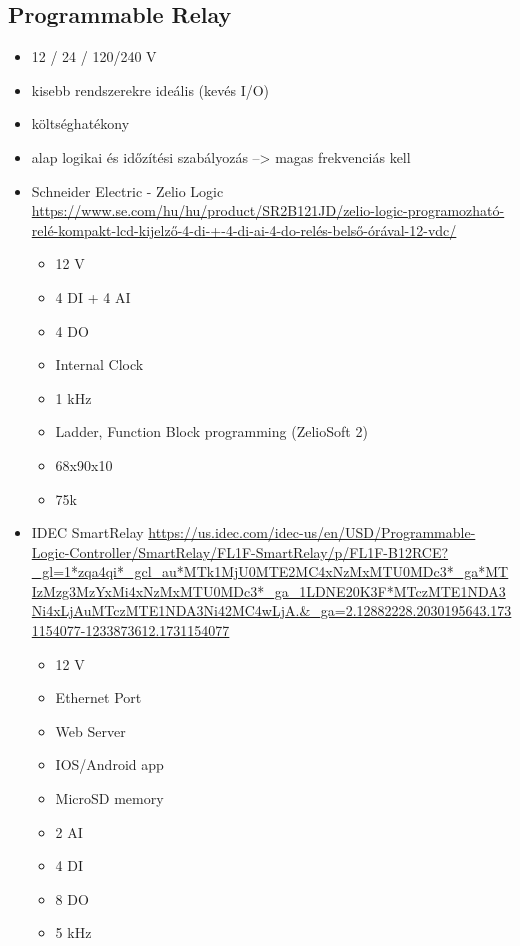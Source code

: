 \documentclass{article}
\begin{document}
	\subsection{Programmable Relay}
	
	\begin{itemize}
		\item 12 / 24 / 120/240 V 
		\item kisebb rendszerekre ideális (kevés I/O)
		\item költséghatékony
		\item alap logikai és időzítési szabályozás --> magas frekvenciás kell
	\end{itemize}
	
	
	\begin{itemize}
		\item Schneider Electric - Zelio Logic\\
			\url{https://www.se.com/hu/hu/product/SR2B121JD/zelio-logic-programozható-relé-kompakt-lcd-kijelző-4-di-+-4-di-ai-4-do-relés-belső-órával-12-vdc/}
			\begin{itemize}
				\item 12 V
				\item 4 DI + 4 AI
				\item 4 DO
				\item Internal Clock
				\item 1 kHz
				\item Ladder, Function Block programming (ZelioSoft 2)
				\item 68x90x10
				\item 75k
			\end{itemize}
		\item IDEC SmartRelay
			\url{https://us.idec.com/idec-us/en/USD/Programmable-Logic-Controller/SmartRelay/FL1F-SmartRelay/p/FL1F-B12RCE?_gl=1*zqa4qi*_gcl_au*MTk1MjU0MTE2MC4xNzMxMTU0MDc3*_ga*MTIzMzg3MzYxMi4xNzMxMTU0MDc3*_ga_1LDNE20K3F*MTczMTE1NDA3Ni4xLjAuMTczMTE1NDA3Ni42MC4wLjA.&_ga=2.12882228.2030195643.1731154077-1233873612.1731154077}
			\begin{itemize}
				\item 12 V
				\item Ethernet Port
				\item Web Server
				\item IOS/Android app
				\item MicroSD memory
				\item 2 AI
				\item 4 DI
				\item 8 DO
				\item 5 kHz

\end{itemize}
\end{itemize}
\end{document}
